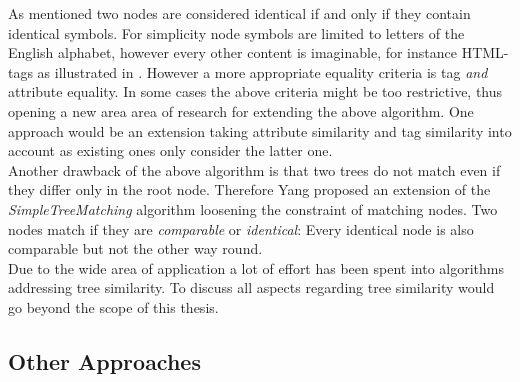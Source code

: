 \documentclass[12pt, notitlepage]{article}
\begin{document}
\vspace{\baselineskip}
As \cite{yang} mentioned two nodes are considered identical if and only if they contain identical symbols. For simplicity
node symbols are limited to letters of the English alphabet, however every other content is imaginable, for instance HTML-tags
as illustrated in \cite{simple-tree-matching}. However a more appropriate equality criteria is tag \textit{and} attribute equality. 
In some cases the above criteria might be too restrictive, thus opening a new area area of research for extending the above algorithm.
One approach would be an extension taking attribute similarity and tag similarity into account as existing
ones\cite{simple-tree-matching} only consider the latter one.\\
Another drawback of the above algorithm is that two trees do not match even if they differ only in the root node. 
Therefore Yang\cite{yang} proposed an extension of the \textit{SimpleTreeMatching} algorithm loosening the constraint of matching
nodes. Two nodes match if they are \textit{comparable} or \textit{identical}: Every identical node is also comparable but not the other way round. \\
Due to the wide area of application a lot of effort has been spent into algorithms addressing tree similarity.
To discuss all aspects regarding tree similarity would go beyond the scope of this thesis. 
\subsection{Other Approaches}

\newpage


\end{document}

